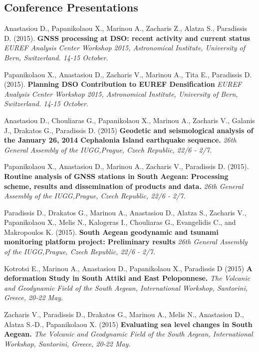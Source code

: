 \documentclass[a4paper]{Classes/cv_prof_en} %
\begin{document}
\subsection*{Conference Presentations}
\renewcommand*{\labelenumi}{C\theenumi.}
\begin{etaremune}
\item Anastasiou D., Papanikolaou X., Marinou A., Zacharis Z., Alatza S., Paradissis D. (2015). \textbf{GNSS processing at DSO: recent activity and current status} \textit{EUREF Analysis Center Workshop 2015, Astronomical Institute, University of Bern, Switzerland. 14-15 October.}
\item Papanikolaou X., Anastasiou D., Zacharis V., Marinou A., Tita E., Paradissis D. (2015). \textbf{Planning DSO Contribution to EUREF Densification} \textit{EUREF Analysis Center Workshop 2015, Astronomical Institute, University of Bern, Switzerland. 14-15 October.}
\item Anastasiou D., Chouliaras G., Papanikolaou X., Marinou A., Zacharis V., Galanis J., Drakatos G., Paradissis D. (2015) \textbf{Geodetic and seismological analysis of the January 26, 2014 Cephalonia Island earthquake sequence.}  \textit{26th General Assembly of the IUGG,Prague, Czech Republic, 22/6 - 2/7.}
\item Papanikolaou X., Anastasiou D., Marinou A., Zacharis V., Paradissis D. (2015). \textbf{ 	Routine analysis of GNSS stations in South Aegean: Processing scheme, results and dissemination of products and data.}  \textit{26th General Assembly of the IUGG,Prague, Czech Republic, 22/6 - 2/7.}
\item Paradissis D., Drakatos G., Marinou A., Anastasiou D., Alatza S., Zacharis V., Papanikolaou X., Melis N., Kalogeras I., Chouliaras G., Evangelidis C., and Makropoulos K. (2015). \textbf{South Aegean geodynamic and tsunami monitoring platform project: Preliminary results}  \textit{26th General Assembly of the IUGG,Prague, Czech Republic, 22/6 - 2/7.}
\item Kotrotsi E., Marinou A., Anastasiou D., Papanikolaou X., Paradissis D (2015) \textbf{A deformation Study in South Attiki and East Peloponnese.} \textit{The Volcanic and Geodynamic Field of the South Aegean, International Workshop, Santorini, Greece, 20-22 May.}
\item Zacharis V., Paradissis D., Drakatos G., Marinou A., Melis N., Anastasiou D., Alatza S.-D., Papanikolaou X. (2015) \textbf{Evaluating sea level changes in South Aegean.}  \textit{The Volcanic and Geodynamic Field of the South Aegean, International Workshop, Santorini, Greece, 20-22 May.}

\end{etaremune}
\end{document}
